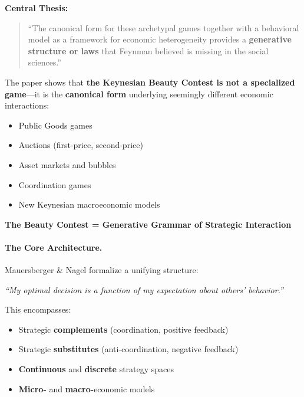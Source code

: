 \begin{tcolorbox}[colback=yellow!5!white, colframe=yellow!75!black,
    title=\textbf{Mauersberger \& Nagel (2018): The Keynesian Beauty Contest as Generative Grammar}]

\textbf{Central Thesis:}
\begin{quote}
``The canonical form for these archetypal games together with a behavioral model as a
framework for economic heterogeneity provides a \textbf{generative structure or laws}
that Feynman believed is missing in the social sciences.''
\end{quote}

The paper shows that \textbf{the Keynesian Beauty Contest is not a specialized game}---it is the
\textbf{canonical form} underlying seemingly different economic interactions:
\begin{itemize}[nosep]
    \item Public Goods games
    \item Auctions (first-price, second-price)
    \item Asset markets and bubbles
    \item Coordination games
    \item New Keynesian macroeconomic models
\end{itemize}

\textbf{The Beauty Contest = Generative Grammar of Strategic Interaction}

\end{tcolorbox}

\paragraph{The Core Architecture.}
Mauersberger \& Nagel formalize a unifying structure:

\begin{center}
\textit{``My optimal decision is a function of my expectation about others' behavior.''}
\end{center}

This encompasses:
\begin{itemize}[nosep]
    \item Strategic \textbf{complements} (coordination, positive feedback)
    \item Strategic \textbf{substitutes} (anti-coordination, negative feedback)
    \item \textbf{Continuous} and \textbf{discrete} strategy spaces
    \item \textbf{Micro-} and \textbf{macro-}economic models
\end{itemize}

